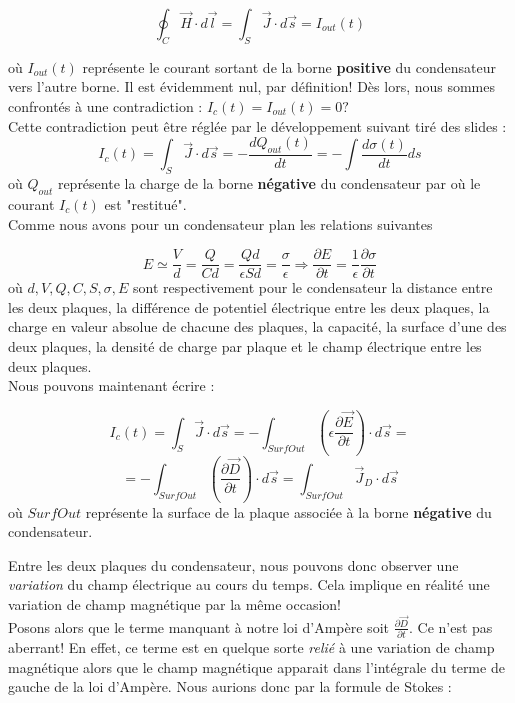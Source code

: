 \[  \oint_{C} \vec{H} \cdot d\vec{l} =  \int_{S} \vec{J} \cdot d\vec{s} = I_{out}(t)\] 

où $I_{out}(t)$ représente le courant sortant de la borne \textbf{positive} du condensateur vers l'autre borne. 
Il est évidemment nul, par définition! Dès lors, nous sommes confrontés à une contradiction : $I_{c}(t) = I_{out}(t) = 0?$ 
\\ 

Cette contradiction peut être réglée par le développement suivant tiré des slides :
\[I_{c}(t) = \int_{S} \vec{J} \cdot d\vec{s} = -\frac{dQ_{out}(t)}{dt} = - \int \frac{d \sigma(t)}{dt} ds\] 
où $Q_{out}$ représente la charge de la borne \textbf{négative} du condensateur par où le courant $I_{c}(t)$ est "restitué". \\ 

Comme nous avons pour un condensateur plan les relations suivantes  

\[ E \simeq \frac{V}{d} = \frac{Q}{Cd} = \frac{Qd}{\epsilon S d} = \frac{\sigma}{\epsilon} \Rightarrow \frac{\partial E}{\partial t} = \frac{1}{\epsilon} \frac{\partial \sigma}{\partial t} \]
où $d,V,Q,C,S,\sigma,E$ sont respectivement pour le condensateur la distance entre les deux plaques, la différence de potentiel électrique entre les deux plaques, la charge en valeur absolue de chacune des plaques, 
la capacité, la surface d'une des deux plaques, la densité de charge par plaque et le champ électrique entre les deux plaques. \\ 
Nous pouvons maintenant écrire :

\[ I_{c}(t) = \int_{S} \vec{J} \cdot d\vec{s} = -\int_{SurfOut}( \epsilon \frac{\partial \vec{E}}{\partial t} )\cdot d\vec{s} = \]
\[ = - \int_{SurfOut} (\frac{\partial \vec{D}}{\partial t}) \cdot d\vec{s}  =  \int_{SurfOut} \vec{J}_{D} \cdot d\vec{s}\]
où $SurfOut$ représente la surface de la plaque associée à la borne \textbf{négative} du condensateur.

Entre les deux plaques du condensateur, nous pouvons donc observer une \textit{variation} du champ électrique au cours du temps. Cela implique en réalité une variation de champ magnétique par la même occasion! \\
Posons alors que le terme manquant à notre loi d'Ampère soit $\frac{\partial \vec{D}}{\partial t}$. Ce n'est pas aberrant!
En effet, ce terme est en quelque sorte \textit{relié} à une variation de champ magnétique alors que le champ magnétique apparait dans l'intégrale du terme de gauche de la loi d'Ampère.
Nous aurions donc par la formule de Stokes : 

